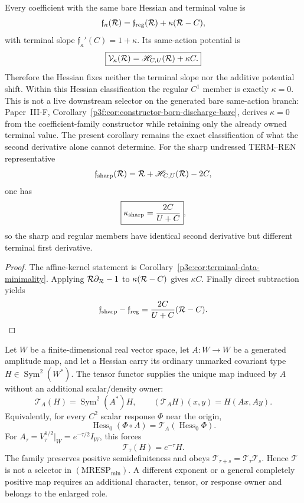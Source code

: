 \documentclass[12pt,a4paper]{article}
\begin{document}
\begin{corollary}
\label{p3e:cor:two-scale-affine-junction-family}
Every coefficient with the same bare Hessian and terminal value is
\[
 \mathfrak f_{\kappa}(\mathcal R)
 =\mathfrak f_{\rm reg}(\mathcal R)+\kappa(\mathcal R-C),
\]
with terminal slope \(\mathfrak f_\kappa'(C)=1+\kappa\).  Its same-action
potential is
\[
 \boxed{\mathcal V_\kappa(\mathcal R)
 =\mathscr H_{C,U}(\mathcal R)+\kappa C.}
\]
Therefore the Hessian fixes neither the terminal slope nor the additive
potential shift.  Within this Hessian classification the regular \(C^1\)
member is exactly \(\kappa=0\).  This is not a live downstream selector on
the generated bare same-action branch: Paper~III-F,
Corollary~\ref{p3f:cor:constructor-born-discharge-bare}, derives
\(\kappa=0\) from the coefficient-family constructor while retaining only the
already owned terminal value.  The present corollary remains the exact
classification of what the second derivative alone cannot determine.
For the sharp undressed TERM--REN representative
\[
 \mathfrak f_{\rm sharp}(\mathcal R)
 =\mathcal R+\mathscr H_{C,U}(\mathcal R)-2C,
\]
one has
\[
 \boxed{\kappa_{\rm sharp}=\frac{2C}{U+C}},
\]
so the sharp and regular members have identical second derivative but
different terminal first derivative.
\end{corollary}
\begin{proof}
The affine-kernel statement is
Corollary~\ref{p3e:cor:terminal-data-minimality}.  Applying
\(\mathcal R\partial_{\mathcal R}-1\) to
\(\kappa(\mathcal R-C)\) gives \(\kappa C\).  Finally direct subtraction yields
\[
 \mathfrak f_{\rm sharp}-\mathfrak f_{\rm reg}
 =\frac{2C}{U+C}(\mathcal R-C).
\]
\end{proof}

\begin{theorem}
\label{p3e:thm:canonical-covariant-hessian-pullback}
Let \(W\) be a finite-dimensional real vector space, let
\(A:W\to W\) be a generated amplitude map, and let a Hessian carry its
ordinary unmarked covariant type
\(H\in\operatorname{Sym}^2(W^*)\).  The tensor functor supplies the unique
map induced by \(A\) without an additional scalar/density owner:
\[
 \boxed{\mathcal T_A(H)=\operatorname{Sym}^2(A^*)H,
 \qquad
 (\mathcal T_AH)(x,y)=H(Ax,Ay).}
\]
Equivalently, for every \(C^2\) scalar response \(\Phi\) near the origin,
\[
 \operatorname{Hess}_0(\Phi\circ A)
 =\mathcal T_A(\operatorname{Hess}_0\Phi).
\]
For \(A_\tau=V_\tau^{1/2}|_W=e^{-\tau/2}I_W\), this forces
\[
 \boxed{\mathcal T_\tau(H)=e^{-\tau}H.}
\]
The family preserves positive semidefiniteness and obeys
\(\mathcal T_{\tau+s}=\mathcal T_\tau\mathcal T_s\).  Hence
\(\mathcal T\) is not a selector in \((\mathrm{MRESP}_{\min})\).  A different
exponent or a general completely positive map requires an additional
character, tensor, or response owner and belongs to the enlarged role.
\end{theorem}
\end{document}
